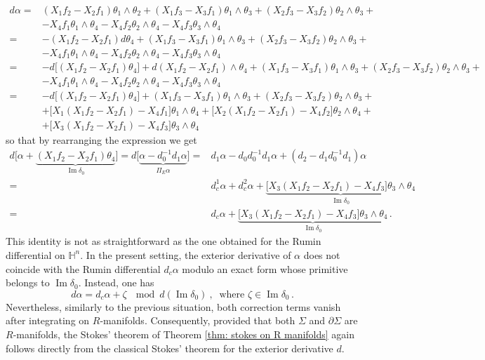\documentclass[dvipsnames]{amsart}
\theoremstyle{definition}
\theoremstyle{definition}
\numberwithin{equation}{section}
\renewcommand{\H}{\mathbb{H}}
\begin{document}
\begin{align*}
    d\alpha=&(X_1f_2-X_2f_1)\theta_1\wedge\theta_2+(X_1f_3-X_3f_1)\theta_1\wedge\theta_3+(X_2f_3-X_3f_2)\theta_2\wedge\theta_3+\\&-X_4f_1\theta_1\wedge\theta_4-X_4f_2\theta_2\wedge\theta_4-X_4f_3\theta_3\wedge\theta_4\\=&-(X_1f_2-X_2f_1)d\theta_4+(X_1f_3-X_3f_1)\theta_1\wedge\theta_3+(X_2f_3-X_3f_2)\theta_2\wedge\theta_3+\\&-X_4f_1\theta_1\wedge\theta_4-X_4f_2\theta_2\wedge\theta_4-X_4f_3\theta_3\wedge\theta_4\\=&-d\big[(X_1f_2-X_2f_1)\theta_4\big]+d(X_1f_2-X_2f_1)\wedge\theta_4+(X_1f_3-X_3f_1)\theta_1\wedge\theta_3+(X_2f_3-X_3f_2)\theta_2\wedge\theta_3+\\&-X_4f_1\theta_1\wedge\theta_4-X_4f_2\theta_2\wedge\theta_4-X_4f_3\theta_3\wedge\theta_4\\=&-d\big[(X_1f_2-X_2f_1)\theta_4\big]+(X_1f_3-X_3f_1)\theta_1\wedge\theta_3+(X_2f_3-X_3f_2)\theta_2\wedge\theta_3+\\&+\big[X_1(X_1f_2-X_2f_1)-X_4f_1\big]\theta_1\wedge\theta_4+\big[X_2(X_1f_2-X_2f_1)-X_4f_2\big]\theta_2\wedge\theta_4+\\&+\big[X_3(X_1f_2-X_2f_1)-X_4f_3\big]\theta_3\wedge\theta_4
\end{align*}
so that by rearranging the expression we get
\begin{align*}
    d\big[\alpha+\underbrace{(X_1f_2-X_2f_1)\theta_4}_{\operatorname{Im}\delta_0}\big]=d\big[\underbrace{\alpha-d_0^{-1}d_1\alpha}_{\Pi_E\alpha}\big]=&d_1\alpha-d_0d_0^{-1}d_1\alpha+(d_2-d_1d_0^{-1}d_1)\alpha\\=&d_c^1\alpha+d_c^2\alpha+\underbrace{\big[X_3(X_1f_2-X_2f_1)-X_4f_3\big]\theta_3\wedge\theta_4}_{\operatorname{Im}\delta_0}\\=&d_c\alpha+\underbrace{\big[X_3(X_1f_2-X_2f_1)-X_4f_3\big]\theta_3\wedge\theta_4}_{\operatorname{Im}\delta_0}\,.
\end{align*}
This identity is not as straightforward as the one obtained for the Rumin differential on \(\H^n\). In the present setting, the exterior derivative of \(\alpha\) does not coincide with the Rumin differential \(d_c\alpha\) modulo an exact form whose primitive belongs to \(\operatorname{Im}\delta_0\). Instead, one has
\[
d\alpha=d_c\alpha+\zeta \ \mod d(\operatorname{Im}\delta_0)\ ,\ \text{ where }
\zeta\in\operatorname{Im}\delta_0\,.
\]
Nevertheless, similarly to the previous situation, both correction terms vanish after integrating on \(R\)-manifolds. Consequently, provided that both \(\Sigma\) and \(\partial\Sigma\) are \(R\)-manifolds, the Stokes' theorem of Theorem \ref{thm: stokes on R manifolds} again follows directly from the classical Stokes' theorem for the exterior derivative \(d\).
\end{document}
